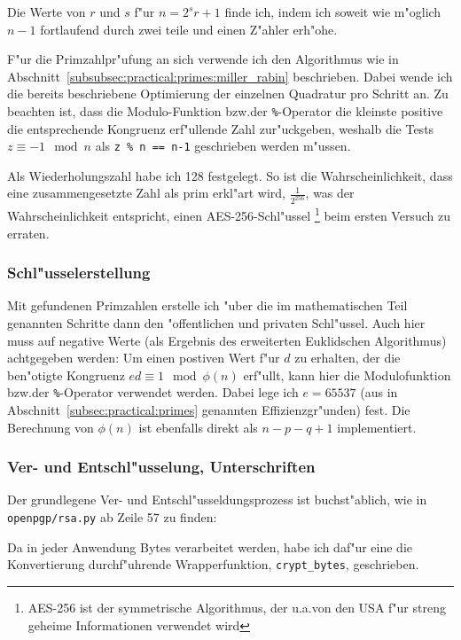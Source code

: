 \documentclass[12pt]{article}
\begin{document}
Die Werte von $r$ und $s$ f"ur $n = 2^s r + 1$ finde ich, indem ich soweit wie m"oglich
$n - 1$ fortlaufend durch zwei teile und einen Z"ahler erh"ohe.

F"ur die Primzahlpr"ufung an sich verwende ich den Algorithmus wie
in Abschnitt~\ref{subsubsec:practical:primes:miller_rabin} be\-schrie\-ben.
Dabei wende ich die bereits beschriebene Optimierung der einzelnen Quadratur pro Schritt an.
Zu beachten ist, dass die Modulo-Funktion bzw.\@ der \verb|%|-Operator
die kleinste positive die entsprechende Kongruenz erf"ullende Zahl zur"uckgeben,
weshalb die Tests $z \equiv -1 \mod n$ als \verb|z % n == n-1| geschrieben werden m"ussen.

Als Wiederholungszahl habe ich 128 festgelegt.
So ist die Wahrscheinlichkeit, dass eine zusammengesetzte Zahl als prim erkl"art wird,
$\frac{1}{2^{256}}$, was der Wahrscheinlichkeit entspricht, einen AES-256-Schl"ussel%
\footnote{AES-256 ist der symmetrische Algorithmus,
der u.a.\@ von den USA f"ur streng geheime Informationen verwendet wird}
beim ersten Versuch zu erraten.

\subsubsection{Schl"usselerstellung}
Mit gefundenen Primzahlen erstelle ich "uber die im mathematischen Teil genannten Schritte
dann den "offentlichen und privaten Schl"ussel.
Auch hier muss auf negative Werte (als Ergebnis des erweiterten Euklidschen Algorithmus)
achtgegeben werden: Um einen postiven Wert f"ur $d$ zu erhalten, der die ben"otigte Kongruenz
$ed \equiv 1 \mod \phi(n)$ erf"ullt, kann hier die Modulofunktion bzw.\@ der \verb|%|-Operator
verwendet werden.
Dabei lege ich $e = 65537$ (aus in Abschnitt~\ref{subsec:practical:primes} genannten Effizienzgr"unden) fest.
Die Berechnung von $\phi(n)$ ist ebenfalls direkt als $n - p - q + 1$ implementiert.

\subsubsection{Ver- und Entschl"usselung, Unterschriften}
Der grundlegene Ver- und Entschl"usseldungsprozess ist buchst"ablich, wie in \\ \texttt{openpgp/rsa.py} ab Zeile 57 zu finden:


Da in jeder Anwendung Bytes verarbeitet werden, habe ich daf"ur eine die Konvertierung
durchf"uhrende Wrapperfunktion, \lstinline{crypt_bytes}, geschrieben.
\end{document}
